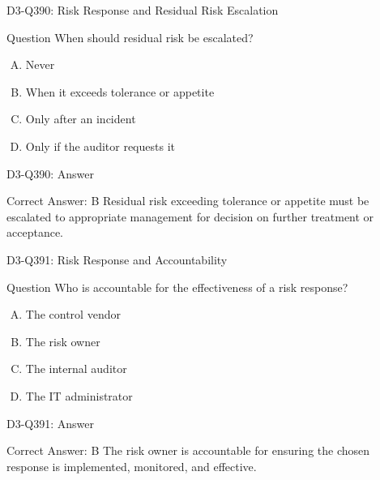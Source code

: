 \documentclass{beamer}
\begin{document}
\begin{frame}{D3-Q390: Risk Response and Residual Risk Escalation}
	\begin{block}{Question}
		When should residual risk be escalated?
	\end{block}
	\begin{enumerate}[(A)]
		\item Never
		\item When it exceeds tolerance or appetite
		\item Only after an incident
		\item Only if the auditor requests it
	\end{enumerate}
\end{frame}
\begin{frame}{D3-Q390: Answer}
	\begin{block}{Correct Answer: B}
		Residual risk exceeding tolerance or appetite must be escalated to appropriate management for decision on further treatment or acceptance.
	\end{block}
\end{frame}

\begin{frame}{D3-Q391: Risk Response and Accountability}
	\begin{block}{Question}
		Who is accountable for the effectiveness of a risk response?
	\end{block}
	\begin{enumerate}[(A)]
		\item The control vendor
		\item The risk owner
		\item The internal auditor
		\item The IT administrator
	\end{enumerate}
\end{frame}
\begin{frame}{D3-Q391: Answer}
	\begin{block}{Correct Answer: B}
		The risk owner is accountable for ensuring the chosen response is implemented, monitored, and effective.
	\end{block}
\end{frame}
\end{document}
